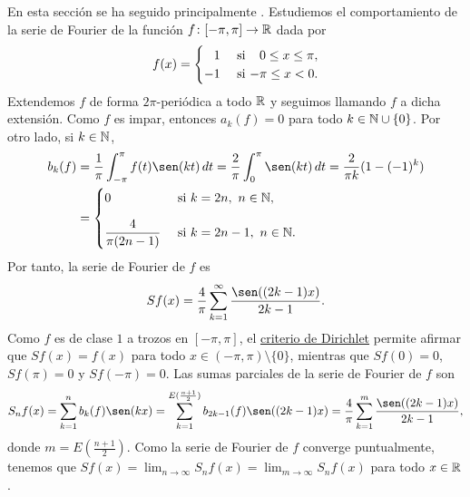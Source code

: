 \documentclass[a4paper, 12pt, oneside]{book}
\begin{document}
En esta sección se ha seguido principalmente \cite{duoandikoetxea2}. Estudiemos el comportamiento de la serie de Fourier de la función $f \colon [-\pi,\pi]\to\mathbb R$ dada por
\[f(x) = \begin{cases}
    \phantom{-}1 & $ si $ \phantom{-}0 \leq x \leq \pi, \\
    -1 & $ si $ -\pi \leq x < 0.
\end{cases}\]
Extendemos $f$ de forma $2\pi$-periódica a todo $\mathbb R$ y seguimos llamando $f$ a dicha extensión. Como $f$ es impar, entonces $a_k(f) = 0$ para todo $k \in \mathbb N \cup \{0\}$. Por otro lado, si $k \in \mathbb N$,
\begin{align*}
    b_k(f) &= \frac{1}{\pi}\integral{-\pi}{\pi}{f(t)\sen(kt)} = \frac{2}{\pi}\integral{0}{\pi}{\sen(kt)} = \frac{2}{\pi k}(1-(-1)^k) \\
    &= \begin{cases}
        0 & $ si $ k = 2n, \ n \in \N, \\[10pt]
        \displaystyle \frac{4}{\pi (2n-1)} & $ si $ k = 2n-1, \ n \in \N.
    \end{cases}
\end{align*}
Por tanto, la serie de Fourier de $f$ es
\[Sf(x) = \frac{4}{\pi}\sum_{k=1}^\infty \frac{\sen((2k-1)x)}{2k-1}.\]
Como $f$ es de clase $1$ a trozos en $[-\pi,\pi]$, el \hyperref[1.2.11]{\color{blue}criterio de Dirichlet} permite afirmar que $Sf(x) = f(x)$ para todo $x \in (-\pi,\pi) \setminus \{0\}$, mientras que $Sf(0) = 0$, $Sf(\pi) = 0$ y $Sf(-\pi) = 0$.
Las sumas parciales de la serie de Fourier de $f$ son
\[S_nf(x) = \sum_{k=1}^n b_k(f)\sen(kx) = \sum_{k=1}^{E(\frac{n+1}{2})}b_{2k-1}(f)\sen((2k-1)x) = \frac{4}{\pi}\sum_{k=1}^{m}\frac{\sen((2k-1)x)}{2k-1},\]
donde $m = E(\frac{n+1}{2})$. Como la serie de Fourier de $f$ converge puntualmente, tenemos que $Sf(x) = \lim_{n\to\infty} S_nf(x) = \lim_{m\to\infty} S_nf(x)$ para todo $x \in \mathbb R$.
\end{document}
